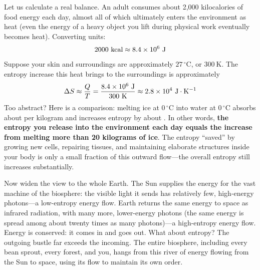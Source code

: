 \begin{qiaoliang}
Let us calculate a real balance. An adult consumes about 2,000 kilocalories of food energy each day, almost all of which ultimately enters the environment as heat (even the energy of a heavy object you lift during physical work eventually becomes heat). Converting units:
\[2000\ \mathrm{kcal} \approx 8.4\times 10^{6}\ \mathrm{J}\]
Suppose your skin and surroundings are approximately $27\,^{\circ}\mathrm{C}$, or $300\ \mathrm{K}$. The entropy increase this heat brings to the surroundings is approximately
\[\Delta S \approx \frac{Q}{T} = \frac{8.4\times 10^{6}\ \mathrm{J}}{300\ \mathrm{K}} \approx 2.8\times 10^{4}\ \mathrm{J\cdot K^{-1}}\]
Too abstract? Here is a comparison: melting ice at $0\,^{\circ}\mathrm{C}$ into water at $0\,^{\circ}\mathrm{C}$ absorbs about  per kilogram and increases entropy by about . In other words, \textbf{the entropy you release into the environment each day equals the increase from melting more than 20 kilograms of ice}. The entropy ``saved'' by growing new cells, repairing tissues, and maintaining elaborate structures inside your body is only a small fraction of this outward flow---the overall entropy still increases substantially.
\end{qiaoliang}

Now widen the view to the whole Earth. The Sun supplies the energy for the vast machine of the biosphere: the visible light it sends has relatively few, high-energy photons---a low-entropy energy flow. Earth returns the same energy to space as infrared radiation, with many more, lower-energy photons (the same energy is spread among about twenty times as many photons)---a high-entropy energy flow. Energy is conserved: it comes in and goes out. What about entropy? The outgoing bustle far exceeds the incoming. The entire biosphere, including every bean sprout, every forest, and you, hangs from this river of energy flowing from the Sun to space, using its flow to maintain its own order.

\begin{center}
\end{center}

